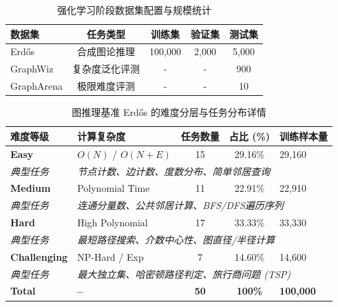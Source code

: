 \begin{table}[htbp]
  \centering
  \caption{强化学习阶段数据集配置与规模统计}
  \label{tab:rl_data_config}
  \renewcommand{\arraystretch}{1.2} %
  \setlength{\tabcolsep}{10pt} %
  \begin{tabular}{lcccc}
  \toprule
  \textbf{数据集} & \textbf{任务类型} & \textbf{训练集} & \textbf{验证集} & \textbf{测试集} \\
  \midrule
  Erd\H{o}s \cite{Guo2025G1TL} & 合成图论推理 & 100,000 & 2,000 & 5,000 \\
  GraphWiz \cite{Chen2024GraphWizAI} & 复杂度泛化评测 & - & - & 900 \\
  GraphArena \cite{Tang2024GraphArenaBL} & 极限难度评测 & - & - & 10 \\
  \bottomrule
  \end{tabular}
\end{table}

\begin{table}[htbp]
  \centering
  \small
  \caption{图推理基准 Erd\H{o}s \cite{Guo2025G1TL}的难度分层与任务分布详情}
  \label{tab:rl_task_distribution}
  \renewcommand{\arraystretch}{1.2}
  \begin{tabular}{llccl}
    \toprule
    \textbf{难度等级} & \textbf{计算复杂度} & \textbf{任务数量} & \textbf{占比 (\%)} & \textbf{训练样本量} \\
    \midrule
    \textbf{Easy} & $O(N)$ / $O(N+E)$ & 15 & 29.16\% & 29,160 \\
    \textit{典型任务} & \multicolumn{4}{p{10cm}}{\small \textit{节点计数、边计数、度数分布、简单邻居查询}} \\
    \midrule
    \textbf{Medium} & Polynomial Time & 11 & 22.91\% & 22,910 \\
    \textit{典型任务} & \multicolumn{4}{p{10cm}}{\small \textit{连通分量数、公共邻居计算、BFS/DFS遍历序列}} \\
    \midrule
    \textbf{Hard} & High Polynomial & 17 & 33.33\% & 33,330 \\
    \textit{典型任务} & \multicolumn{4}{p{10cm}}{\small \textit{最短路径搜索、介数中心性、图直径/半径计算}} \\
    \midrule
    \textbf{Challenging} & NP-Hard / Exp & 7 & 14.60\% & 14,600 \\
    \textit{典型任务} & \multicolumn{4}{p{10cm}}{\small \textit{最大独立集、哈密顿路径判定、旅行商问题 (TSP)}} \\
    \midrule
    \textbf{Total} & \textbf{--} & \textbf{50} & \textbf{100\%} & \textbf{100,000} \\
    \bottomrule
  \end{tabular}
\end{table}

